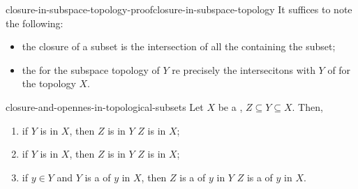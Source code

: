 \documentclass[preview]{standalone}
\begin{document}
\begin{snippetproof}{closure-in-subspace-topology-proof}{closure-in-subspace-topology}{}
    It suffices to note the following:
    \begin{itemize}
        \item the closure of a subset is the intersection of all the 
        containing the subset;
        \item the  for the subspace topology of \(Y\)
        re precisely the intersecitons with \(Y\)
        of  for the topology \(X\).
    \end{itemize}
\end{snippetproof}

\begin{snippetlemma}{closure-and-opennes-in-topological-subsets}{}
    Let \(X\) be a \topologicalspace, \(Z \subseteq Y \subseteq X\). Then,
    \begin{enumerate}
        \item if \(Y\) is \topologicalspace[open][Open] in \(X\),
        then \(Z\) is \topologicalspace[open][Open] in \(Y\)
        \ifandonlyif \(Z\) is \topologicalspace[open][Open] in \(X\);
        \item if \(Y\) is \closedset[closed] in \(X\),
        then \(Z\) is \closedset[closed] in \(Y\)
        \ifandonlyif \(Z\) is \closedset[closed] in \(X\);
        \item if \(y\in Y\) and \(Y\) is a \neighborhood of \(y\) in \(X\),
        then \(Z\) is a \neighborhood of \(y\) in \(Y\) \ifandonlyif \(Z\)
        is a \neighborhood of \(y\) in \(X\).
    \end{enumerate}
\end{snippetlemma}
\end{document}
